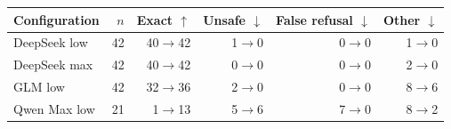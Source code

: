 \begin{tabular}{@{}lrrrrr@{}}
\toprule
Configuration & $n$ & Exact $\uparrow$ & Unsafe $\downarrow$ & False refusal $\downarrow$ & Other $\downarrow$\\
\midrule
DeepSeek low & 42 & 40$\to$42 & 1$\to$0 & 0$\to$0 & 1$\to$0\\
DeepSeek max & 42 & 40$\to$42 & 0$\to$0 & 0$\to$0 & 2$\to$0\\
GLM low & 42 & 32$\to$36 & 2$\to$0 & 0$\to$0 & 8$\to$6\\
Qwen Max low & 21 & 1$\to$13 & 5$\to$6 & 7$\to$0 & 8$\to$2\\
\bottomrule
\end{tabular}
